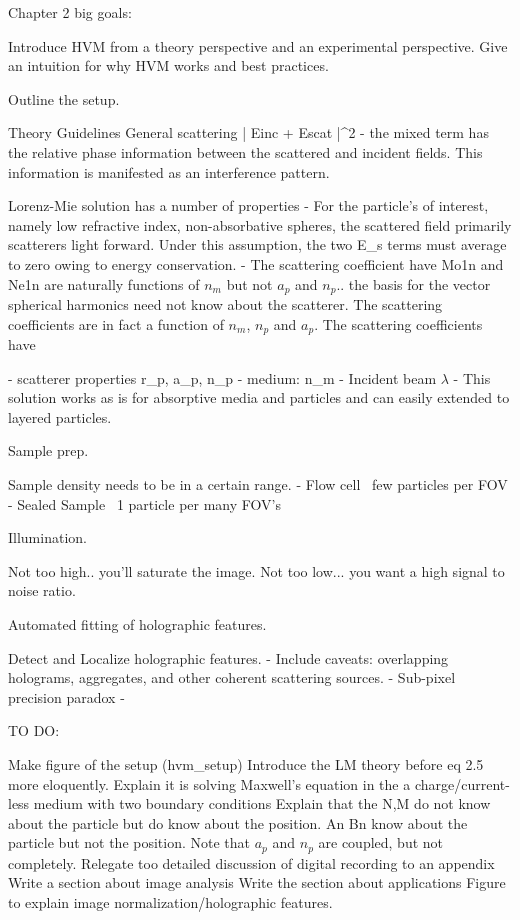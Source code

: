Chapter 2 big goals:

Introduce HVM from a theory perspective and an experimental perspective.
Give an intuition for why HVM works and best practices.

Outline the setup.

Theory Guidelines
 General scattering | Einc + Escat |^2
 - the mixed term has the relative phase information between
   the scattered and incident fields. This information is manifested
   as an interference pattern.

 Lorenz-Mie solution has a number of properties
 - For the particle's of interest, namely low refractive index, non-absorbative
 spheres, the scattered field primarily scatterers light forward. Under this
 assumption, the two E_s terms must average to zero owing to energy conservation.
 - The scattering coefficient have
 Mo1n and Ne1n are naturally functions of $n_m$ but not $a_p$ and $n_p$.. the basis
 for the vector spherical harmonics need not know about the scatterer. The scattering
 coefficients are in fact a function of $n_m$, $n_p$ and $a_p$. The scattering coefficients
 have

 - scatterer properties r_p, a_p, n_p
 - medium: n_m
 - Incident beam  $\lambda$
 - This solution works as is for absorptive media and particles and can easily
 extended to layered particles.


Sample prep.

Sample density needs to be in a certain range.
- Flow cell ~few particles per FOV
- Sealed Sample ~1 particle per many FOV's

Illumination.

Not too high.. you'll saturate the image.
Not too low... you want a high signal to noise ratio.

Automated fitting of holographic features.

Detect and Localize holographic features.
- Include caveats: overlapping holograms, aggregates, and other coherent scattering sources.
- Sub-pixel precision paradox
- 


TO DO:

   Make figure of the setup (hvm_setup)
   Introduce the LM theory before eq 2.5 more eloquently. Explain it is solving
   Maxwell's equation in the a charge/current-less medium with two boundary
   conditions
   Explain that the N,M do not know about the particle but do know
   about the position. An Bn know about the
   particle but not the position. Note that $a_p$ and $n_p$ are coupled,
   but not completely.
   Relegate too detailed discussion of digital recording to an appendix
   Write a section about image analysis
   Write the section about applications
   Figure to explain image normalization/holographic features.
